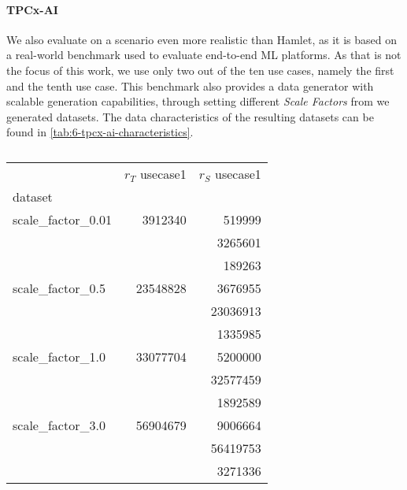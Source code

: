 \paragraph{TPCx-AI \cite{tpcx-ai}} We also evaluate on a scenario even more realistic than Hamlet, as it is based on a real-world benchmark used to evaluate end-to-end ML platforms. As that is not the focus of this work, we use only two out of the ten use cases, namely the first and the tenth use case. This benchmark also provides a data generator with scalable generation capabilities, through setting different \emph{Scale Factors} from  we generated  datasets. The data characteristics of the resulting datasets can be found in \autoref{tab:6-tpcx-ai-characteristics}.
\begin{table}[ht]
  \centering
  \begin{tabular}{lrr}
    \toprule
    {}                  & $r_T$ usecase1 & $r_S$ usecase1 \\
    dataset             &                &                \\
    \midrule
    scale\_factor\_0.01 & 3912340        & 519999         \\
                        &                & 3265601        \\
                        &                & 189263         \\
    scale\_factor\_0.5  & 23548828       & 3676955        \\
                        &                & 23036913       \\
                        &                & 1335985        \\
    scale\_factor\_1.0  & 33077704       & 5200000        \\
                        &                & 32577459       \\
                        &                & 1892589        \\
    scale\_factor\_3.0  & 56904679       & 9006664        \\
                        &                & 56419753       \\
                        &                & 3271336        \\
    \bottomrule
  \end{tabular}
  \caption{}
  \label{tab:6-tpcx-ai-characteristics}
\end{table}

